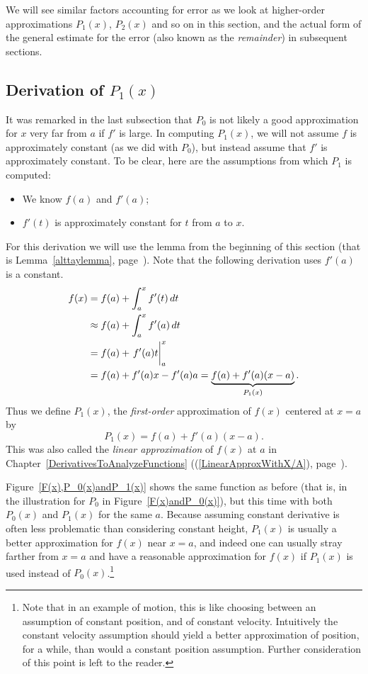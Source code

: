 We will see similar factors accounting for error 
as we look at higher-order approximations
$P_1(x)$, $P_2(x)$ and
so on in this section, and the actual form of the
general estimate for the error
(also known as the {\it remainder}) in subsequent sections.




\subsection{Derivation of $P_1(x)$}
It was remarked in the last subsection that $P_0$ is not likely a good
approximation for $x$ very far from $a$ if $f'$ is large.
In computing $P_1(x)$, we will not assume $f$ is approximately
constant (as we did 
with $P_0$), but instead assume that $f'$ is approximately constant.
To be clear, here are the assumptions from which $P_1$ is computed:
\begin{itemize}
\item We know $f(a)$ and $f'(a)$;
\item $f'(t)$ is approximately constant for $t$ from $a$ to $x$.
\end{itemize}
For this derivation we will use the lemma from the beginning
of this section (that is Lemma~\ref{alttaylemma}, page~\pageref{alttaylemma}).
Note that the following derivation uses $f'(a)$ is a constant.
\begin{align*}
f(x)&=f(a)+\int_a^xf'(t)\,dt\\
    &\approx f(a)+\int_a^xf'(a)\,dt\\
    &=f(a)+\left.\vphantom{\int}f'(a)t\right|_a^x\\
    &=f(a)+f'(a)x-f'(a)a
    =\underbrace{f(a)+f'(a)(x-a)}_{P_1(x)}.\end{align*}
Thus we define $P_1(x)$, the {\it first-order} approximation
of $f(x)$ centered at $x=a$ by
\begin{equation}P_1(x)=f(a)+f'(a)(x-a).\label{DefOfP_1(x)}
\end{equation}
This was also called the {\it linear approximation} of $f(x)$ at
$a$ in Chapter~\ref{DerivativesToAnalyzeFunctions}
((\ref{LinearApproxWithX/A}), page~\pageref{LinearApproxWithX/A}).

Figure~\ref{F(x),P_0(x)andP_1(x)} shows the same function as before
(that is, in the illustration for $P_0$ in Figure~\ref{F(x)andP_0(x)}),
but this time with both $P_0(x)$ and $P_1(x)$ for the same $a$.
Because assuming constant derivative is often less problematic
than considering constant height, $P_1(x)$ is usually a better
approximation for $f(x)$ near $x=a$, and indeed one can usually
stray farther from $x=a$ and have a reasonable approximation
for $f(x)$ if $P_1(x)$ is used instead of $P_0(x)$.\footnote{%
Note that in an example of motion, this is like choosing
between an assumption of constant position, and of constant velocity.
Intuitively the constant velocity assumption should yield a better
approximation of position, for a while,
than would a constant position assumption.
Further consideration of this point is left to the reader.%
}

